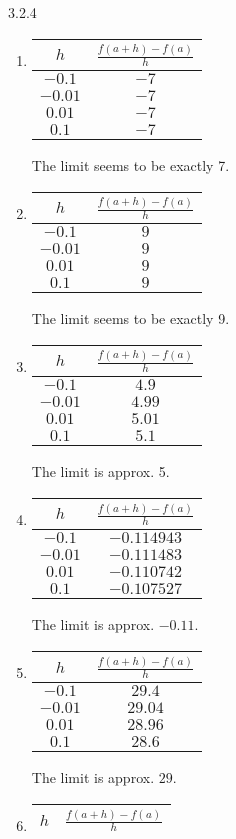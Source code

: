 \begin{Answer}{3.2.4}
\begin{enumerate}
\item
{\begin{tabular}{cc}
$h$ & $\frac{f(a+h)-f(a)}{h}$\\ \hline
 $-0.1$ & $-7$ \\
 $-0.01$ & $-7$ \\
 $0.01$ & $-7$ \\
 $0.1$ & $-7$
\end{tabular}
The limit seems to be exactly 7.
}
\item
{\begin{tabular}{cc}
$h$ & $\frac{f(a+h)-f(a)}{h}$\\ \hline
 $-0.1$ & $9$ \\
 $-0.01$ & $9$ \\
 $0.01$ & $9$ \\
 $0.1$ & $9$
\end{tabular}
The limit seems to be exactly 9.
}
\item
{\begin{tabular}{cc}
$h$ & $\frac{f(a+h)-f(a)}{h}$\\ \hline
 $-0.1$ & $4.9$ \\
 $-0.01$ & $4.99$ \\
 $0.01$ & $5.01$ \\
 $0.1$ & $5.1$
\end{tabular}
The limit is approx. 5.
}
\item
{\begin{tabular}{cc}
$h$ & $\frac{f(a+h)-f(a)}{h}$\\ \hline
 $-0.1$ & $-0.114943$ \\
 $-0.01$ & $-0.111483$ \\
 $0.01$ & $-0.110742$ \\
 $0.1$ & $-0.107527$
\end{tabular}
The limit is approx. $-0.11$.
}
\item
{\begin{tabular}{cc}
$h$ & $\frac{f(a+h)-f(a)}{h}$\\ \hline
 $-0.1$ & $29.4$ \\
 $-0.01$ & $29.04$ \\
 $0.01$ & $28.96$ \\
 $0.1$ & $28.6$
\end{tabular}
The limit is approx. $29$.
}
\item
{\begin{tabular}{cc}
$h$ & $\frac{f(a+h)-f(a)}{h}$\\ \hline

\end{tabular}}
\end{enumerate}
\end{Answer}
